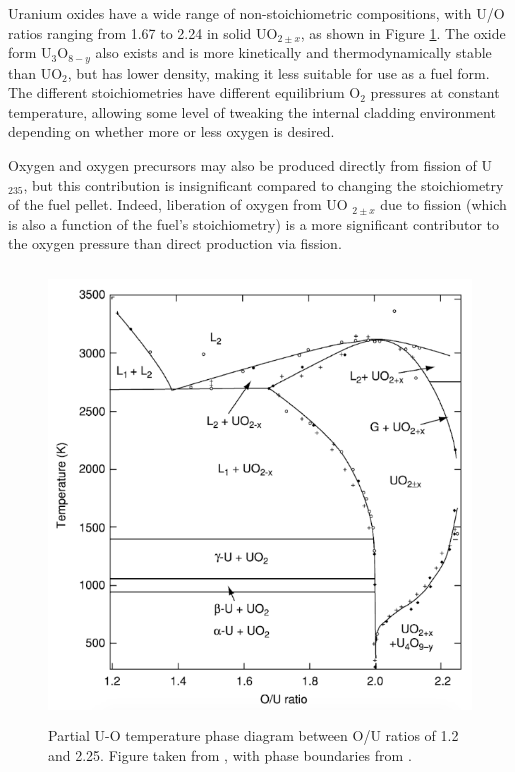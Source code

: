 Uranium oxides have a wide range of non-stoichiometric compositions, with U/O ratios ranging from 1.67 to 2.24 in solid UO$_{2 \pm x}$, as shown in Figure \ref{figure:U_O_phase_diagram}. The oxide form U$_{3}$O$_{8-y}$ also exists and is more kinetically and thermodynamically stable than UO$_{2}$, but has lower density, making it less suitable for use as a fuel form. The different stoichiometries have different equilibrium O$_{2}$ pressures at constant temperature, allowing some level of tweaking the internal cladding environment depending on whether more or less oxygen is desired. 

Oxygen and oxygen precursors may also be produced directly from fission of U
$_{235}$, but this contribution is insignificant compared to changing the stoichiometry of the fuel pellet. Indeed, liberation of oxygen from UO
$_{2 \pm x}$ due to fission (which is also a function of the fuel's stoichiometry) is a more significant contributor to the oxygen pressure than direct production via fission.

\begin{figure}[htp]
\centering
\includegraphics[height=12cm]{images/UO_phase_diagram.png}
\caption[Partial U-O temperature phase diagram between O/U ratios of 1.2 and 2.25.]{Partial U-O temperature phase diagram between O/U ratios of 1.2 and 2.25. Figure taken from \cite{katz2007chemistry}, with phase boundaries from \cite{rand1978thermodynamic, chevalier2002progress, gueneau2002thermodynamic}.}
\label{figure:U_O_phase_diagram}
\end{figure}


